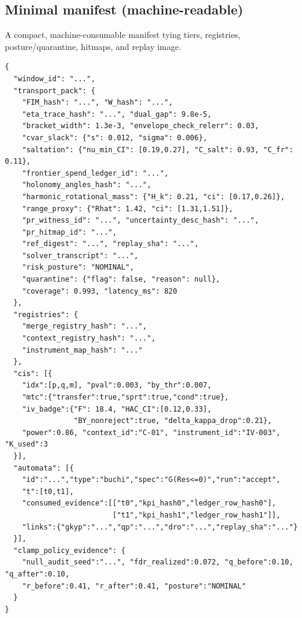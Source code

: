 \documentclass[10pt]{article}
\begin{document}
\subsection{Minimal manifest (machine-readable)}
\noindent A compact, machine-consumable manifest tying tiers, registries, posture/quarantine, hitmaps, and replay image.
\begin{lstlisting}
{
  "window_id": "...",
  "transport_pack": {
    "FIM_hash": "...", "W_hash": "...",
    "eta_trace_hash": "...", "dual_gap": 9.8e-5,
    "bracket_width": 1.3e-3, "envelope_check_relerr": 0.03,
    "cvar_slack": {"s": 0.012, "sigma": 0.006},
    "saltation": {"nu_min_CI": [0.19,0.27], "C_salt": 0.93, "C_fr": 0.11},
    "frontier_spend_ledger_id": "...",
    "holonomy_angles_hash": "...",
    "harmonic_rotational_mass": {"H_k": 0.21, "ci": [0.17,0.26]},
    "range_proxy": {"Rhat": 1.42, "ci": [1.31,1.51]},
    "pr_witness_id": "...", "uncertainty_desc_hash": "...",
    "pr_hitmap_id": "...",
    "ref_digest": "...", "replay_sha": "...",
    "solver_transcript": "...",
    "risk_posture": "NOMINAL",
    "quarantine": {"flag": false, "reason": null},
    "coverage": 0.993, "latency_ms": 820
  },
  "registries": {
    "merge_registry_hash": "...",
    "context_registry_hash": "...",
    "instrument_map_hash": "..."
  },
  "cis": [{
    "idx":[p,q,m], "pval":0.003, "by_thr":0.007,
    "mtc":{"transfer":true,"sprt":true,"cond":true},
    "iv_badge":{"F": 18.4, "HAC_CI":[0.12,0.33],
                "BY_nonreject":true, "delta_kappa_drop":0.21},
    "power":0.86, "context_id":"C-01", "instrument_id":"IV-003", "K_used":3
  }],
  "automata": [{
    "id":"...","type":"buchi","spec":"G(Res<=0)","run":"accept",
    "t":[t0,t1],
    "consumed_evidence":[["t0","kpi_hash0","ledger_row_hash0"],
                         ["t1","kpi_hash1","ledger_row_hash1"]],
    "links":{"gkyp":"...","qp":"...","dro":"...","replay_sha":"..."}
  }],
  "clamp_policy_evidence": {
    "null_audit_seed":"...", "fdr_realized":0.072, "q_before":0.10, "q_after":0.10,
    "r_before":0.41, "r_after":0.41, "posture":"NOMINAL"
  }
}
\end{lstlisting}
\end{document}
